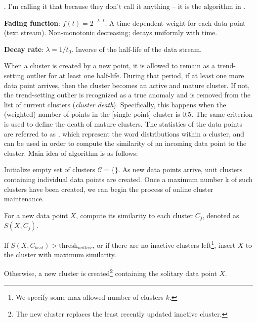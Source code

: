 \documentclass[11pt]{article}
\newcommand\myspace[1][]{\vspace{#1\bigskipamount}}
\newcommand\p{\Needspace{10\baselineskip} \noindent}
\newcommand\myref[1]{\purple{[#1]}}
\begin{document}
\myspace
\p {}. I'm calling it that because they don't call it anything -- it is the algorithm in \myref{3}. 
\begin{compactitem}
	\item \textbf{Fading function}: $f(t) = 2^{-\lambda \cdot t}$. A time-dependent weight for each data point (text stream). Non-monotonic decreasing; decays uniformly with time. 
	
	\item \textbf{Decay rate}: $\lambda = 1/t_0$. Inverse of the half-life of the data stream.
\end{compactitem}
When a cluster is created by a new point, it is allowed to remain as a trend-setting outlier for at least one half-life. During that period, if at least one more data point arrives, then the cluster becomes an active and mature cluster. If not, the trend-setting outlier is recognized as a true anomaly and is removed from the list of current clusters (\textit{cluster death}). Specifically, this happens when the (weighted) number of points in the [single-point] cluster is 0.5. The same criterion is used to define the death of
mature clusters. The statistics of the data points are referred to as , which represent the word distributions within a cluster, and can be used in order to compute the similarity of an incoming data point to the cluster. Main idea of algorithm is as follows:
\begin{compactenum}
	\item Initialize empty set of clusters $\mathcal{C} = \{\}$. As new data points arrive, unit clusters
	containing individual data points are created. Once a maximum number k of such clusters have been created, we can begin the process of online cluster maintenance.
	
	\item For a new data point $X$, compute its similarity to each cluster $C_j$, denoted as $S(X, C_j)$.
	\begin{compactitem}[-]
		\item If $S(X, C_{best}) > \text{thresh}_{outlier}$, or if there are no inactive clusters left\footnote{We specify some max allowed number of clusters $k$.},  insert $X$ to the cluster with maximum similarity.
		\item Otherwise, a new cluster is created\footnote{The new cluster replaces the least recently updated inactive cluster.} containing the solitary data point $X$.
	\end{compactitem} 
\end{compactenum}
\end{document}
